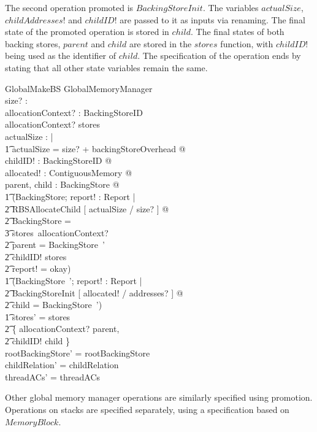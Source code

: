 \documentclass[a4paper,10pt]{article}
\begin{document}
The second operation promoted is $BackingStoreInit$. The variables
$actualSize$, $childAddresses!$ and $childID!$ are passed to it as inputs via
renaming. The final state of the promoted operation is stored in $child$.  The final 
states of both backing stores, $parent$ and $child$ are stored in the $stores$
function, with $childID!$ being used as the identifier of $child$. The 
specification of the operation ends by stating that all other state variables
remain the same.
%
\begin{schema}{GlobalMakeBS}
  \Delta GlobalMemoryManager \\
  size? : \nat \\
  allocationContext? : BackingStoreID \\
\where
  allocationContext? \in \dom stores \\
  \exists actualSize : \nat | \\
  \t1 actualSize = size? + backingStoreOverhead @ \\
  \exists childID! : BackingStoreID @ \\
  \exists allocated! : ContiguousMemory @ \\
  \exists parent, child : BackingStore @ \\
  \t1 (\exists \Delta BackingStore; report! : Report | \\
    \t2 RBSAllocateChild [ actualSize / size? ] @ \\
    \t2 \theta BackingStore = \\
      \t3 stores~allocationContext? \land \\
    \t2 parent = \theta BackingStore~' \land \\
    \t2 childID! \notin \dom stores \land \\
    \t2 report! = okay) \land \\
  \t1 (\exists BackingStore~'; report! : Report | \\
    \t2 BackingStoreInit [ allocated! / addresses? ] @ \\
    \t2 child = \theta BackingStore~') \land \\
  \t1 stores' = stores \oplus \\
    \t2 \{ allocationContext? \mapsto parent, \\
    \t2 childID! \mapsto child \} \\
  rootBackingStore' = rootBackingStore \\
  childRelation' = childRelation \\
  threadACs' = threadACs \\
\end{schema}
%
Other global memory manager operations are similarly specified using
promotion. Operations on stacks are specified separately, using a
specification based on $MemoryBlock$.

\printbibliography
\end{document}
